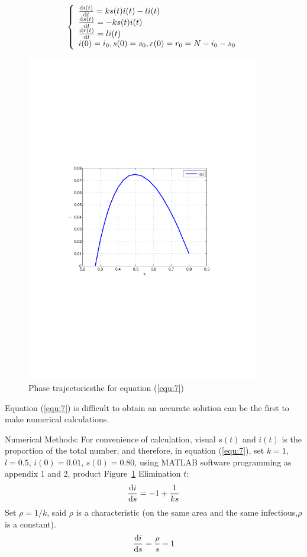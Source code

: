 \begin{equation}
\left\{
\begin{array}{l}
\frac{{\mathrm{d}}i(t)}{{\mathrm{d}}t}=ks(t)i(t)-li(t)\\
\frac{{\mathrm{d}}s(t)}{{\mathrm{d}}t}=-ks(t)i(t)\\
\frac{{\mathrm{d}}r(t)}{{\mathrm{d}}t}=li(t)\\
i(0)=i_0,s(0)=s_0,r(0)=r_0=N-i_0-s_0
\end{array}\right.
\label{equ:7}
\end{equation}
\begin{figure}
\includegraphics[width=4in]{imgs/sars3_2.pdf}
\caption{Phase trajectoriesthe for equation (\ref{equ:7})}
\label{fig:2}
\end{figure}
Equation (\ref{equ:7}) is difficult to obtain an accurate
solution can be the first to make numerical calculations.\par
Numerical Methods: For convenience of calculation, visual
 $ s(t) $ and $ i(t) $ is the proportion of the total number,
 and therefore, in equation (\ref{equ:7}), set $k=1$,
  $l=0.5$, $i(0)=0.01$, $s(0)=0.80$, using MATLAB software
 programming as appendix 1 and 2, product Figure~\ref{fig:2}
Elimination $ t $:
\begin{equation}
\frac{{\mathrm{d}}i}{{\mathrm{d}}s}=-1+\frac{1}{ks}
\label{equ:8}
\end{equation}
Set $\rho=1/k$, said $\rho$ is a characteristic (on the
same area and the same infectious,$\rho$ is a constant).
\begin{equation}
\frac{{\mathrm{d}}i}{{\mathrm{d}}s}=\frac{\rho}{s}-1
\label{equ:9}
\end{equation}

